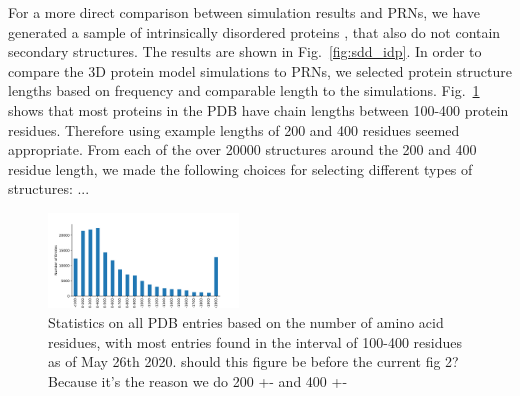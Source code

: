 \documentclass[reprint,amsmath,amssymb,rmp,onecolumn,notitlepage,11pt]{revtex4-1}
\newcommand{\red}[1]{\textcolor{red!80!black}{#1}}
\newcommand{\gray}[1]{\textcolor{gray!80!black}{#1}}
\begin{document}
\gray{For a more direct comparison between simulation results and PRNs, we have generated a sample of intrinsically disordered proteins \cite{something}, that also do not contain secondary structures. The results are shown in Fig.~\ref{fig:sdd_idp}.
In order to compare the 3D protein model simulations to PRNs, we selected protein structure lengths based on frequency and comparable length to the simulations. Fig.~\ref{fig:pdb_stats} shows that most proteins in the PDB have chain lengths between 100-400 protein residues. Therefore using example lengths of 200 and 400 residues seemed appropriate. From each of the over 20000 structures around the 200 and 400 residue length, we made the following choices for selecting different types of structures:
...}

\begin{figure}[h]
        \centering
	\includegraphics[width=0.45\textwidth]{figures/pdb_statistics.pdf}
        \caption{Statistics on all PDB entries based on the number of amino acid residues, with most entries found in the interval of 100-400 residues as of May 26th 2020. \red{should this figure be before the current fig 2? Because it's the reason we do 200 +- and 400 +-}
        }
        \label{fig:pdb_stats}
\end{figure}
\end{document}
